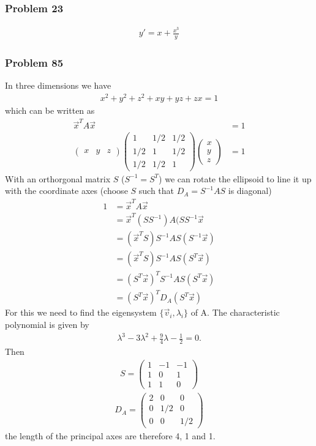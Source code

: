 \documentclass[10pt,a4paper]{article}
\theoremstyle{definition}
\begin{document}
\subsubsection{Problem 23}
\begin{align}
    y'=x+\frac{x^3}{y}
\end{align}

\subsubsection{Problem 85}
In three dimensions we have
\begin{align}
    x^2+y^2+z^2+xy+yz+zx=1
\end{align}
which can be written as
\begin{align}
\vec{x}^TA\vec{x}&=1\\
\begin{pmatrix}
x & y & z
\end{pmatrix}
\begin{pmatrix}
1 & 1/2 & 1/2\\
1/2 & 1 & 1/2\\
1/2 & 1/2 & 1
\end{pmatrix}
\begin{pmatrix}
x\\
y\\
z
\end{pmatrix}&=1
\end{align}
With an orthorgonal matrix $S$ ($S^{-1}=S^T$) we can rotate the ellipsoid to line it up with the coordinate axes (choose $S$ such that $D_A=S^{-1}AS$ is diagonal)
\begin{align}
1&=\vec{x}^TA\vec{x}\\
&=\vec{x}^T(SS^{-1})A(SS^{-1}\vec{x}\\
&=(\vec{x}^TS)S^{-1}AS(S^{-1}\vec{x})\\
&=(\vec{x}^TS)S^{-1}AS(S^T\vec{x})\\
&=(S^T\vec{x})^TS^{-1}AS(S^T\vec{x})\\
&=(S^T\vec{x})^TD_A(S^T\vec{x})
\end{align}
For this we need to find the eigensystem $\{\vec{v}_i,\lambda_i\}$ of A. The characteristic polynomial is given by
\begin{align}
    \lambda^3-3\lambda^2+\frac{9}{4}\lambda-\frac{1}{2}=0.
\end{align}
Then
\begin{align}
S=\begin{pmatrix}
1 & -1&-1\\
1 & 0 & 1\\
1 & 1 & 0
\end{pmatrix}
\end{align}
\begin{align}
D_A=\begin{pmatrix}
2 & 0   & 0\\
0 & 1/2 & 0\\
0 & 0   & 1/2
\end{pmatrix}
\end{align}
the length of the principal axes are therefore 4, 1 and 1.
\end{document}
